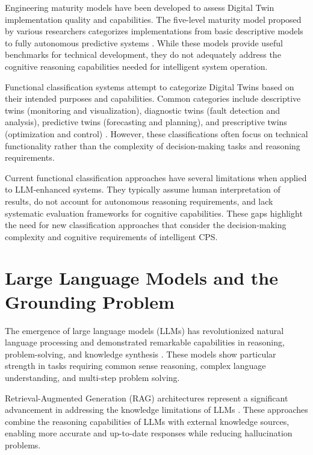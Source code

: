 Engineering maturity models have been developed to assess Digital Twin implementation quality and capabilities. The five-level maturity model proposed by various researchers categorizes implementations from basic descriptive models to fully autonomous predictive systems \cite{rasheed2020digital, tao2019digital}. While these models provide useful benchmarks for technical development, they do not adequately address the cognitive reasoning capabilities needed for intelligent system operation.

Functional classification systems attempt to categorize Digital Twins based on their intended purposes and capabilities. Common categories include descriptive twins (monitoring and visualization), diagnostic twins (fault detection and analysis), predictive twins (forecasting and planning), and prescriptive twins (optimization and control) \cite{kritzinger2018digital, negri2017review}. However, these classifications often focus on technical functionality rather than the complexity of decision-making tasks and reasoning requirements.

Current functional classification approaches have several limitations when applied to LLM-enhanced systems. They typically assume human interpretation of results, do not account for autonomous reasoning requirements, and lack systematic evaluation frameworks for cognitive capabilities. These gaps highlight the need for new classification approaches that consider the decision-making complexity and cognitive requirements of intelligent CPS.

\section{Large Language Models and the Grounding Problem}

The emergence of large language models (LLMs) has revolutionized natural language processing and demonstrated remarkable capabilities in reasoning, problem-solving, and knowledge synthesis \cite{brown2020language, chowdhery2022palm, openai2023gpt4}. These models show particular strength in tasks requiring common sense reasoning, complex language understanding, and multi-step problem solving.

Retrieval-Augmented Generation (RAG) architectures represent a significant advancement in addressing the knowledge limitations of LLMs \cite{lewis2020retrieval, karpukhin2020dense}. These approaches combine the reasoning capabilities of LLMs with external knowledge sources, enabling more accurate and up-to-date responses while reducing hallucination problems.

